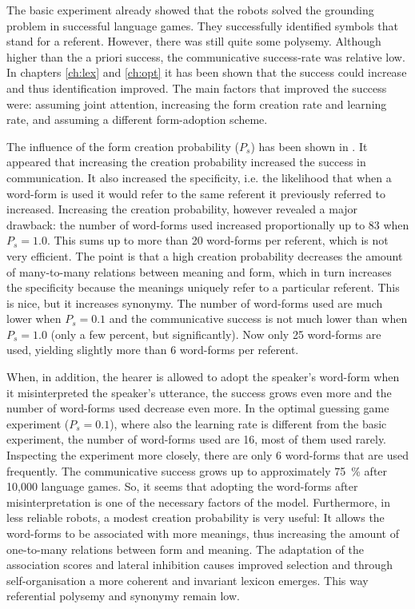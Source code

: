The basic experiment already showed that the robots solved the grounding problem in successful language games. They successfully identified symbols that stand for a referent. However, there was still quite some polysemy. Although higher than the a priori success, the communicative success-rate was relative low. In chapters \ref{ch:lex} and \ref{ch:opt} it has been shown that the success could increase and thus identification improved. The main factors that improved the success were: assuming joint attention, increasing the form creation rate and learning rate, and assuming a different form-adoption scheme.

The influence of the form creation probability ($P_s$) has been shown in . It appeared that increasing the creation probability increased the success in communication. It also increased the specificity, i.e. the likelihood that when a word-form is used it would refer to the same referent it previously referred to increased. Increasing the creation probability, however revealed a major drawback: the number of word-forms used increased proportionally up to 83 when $P_s=1.0$. This sums up to more than 20 word-forms per referent, which is not very efficient. The point is that a high creation probability decreases the amount of many-to-many relations between meaning and form, which in turn increases the specificity because the meanings uniquely refer to a particular referent. This is nice, but it increases synonymy. The number of word-forms used are much lower when $P_s=0.1$ and the communicative success is not much lower than when $P_s=1.0$ (only a few percent, but significantly). Now only 25 word-forms are used, yielding slightly more than 6 word-forms per referent. 

When, in addition, the hearer is allowed to adopt the speaker's word-form when it misinterpreted the speaker's utterance, the success grows even more and the number of word-forms used decrease even more. In the optimal guessing game experiment ($P_s=0.1$), where also the learning rate is different from the basic experiment, the number of word-forms used are 16, most of them used rarely. Inspecting the experiment more closely, there are only 6 word-forms that are used frequently. The communicative success grows up to approximately 75~\% after 10,000 language games. So, it seems that adopting the word-forms after misinterpretation is one of the necessary factors of the model. Furthermore, in less reliable robots, a modest creation probability is very useful: It allows the word-forms to be associated with more meanings, thus increasing the amount of one-to-many relations between form and meaning. The adaptation of the association scores and lateral inhibition causes improved selection and through self-organisation a more coherent and invariant lexicon emerges. This way referential polysemy and synonymy remain low.

